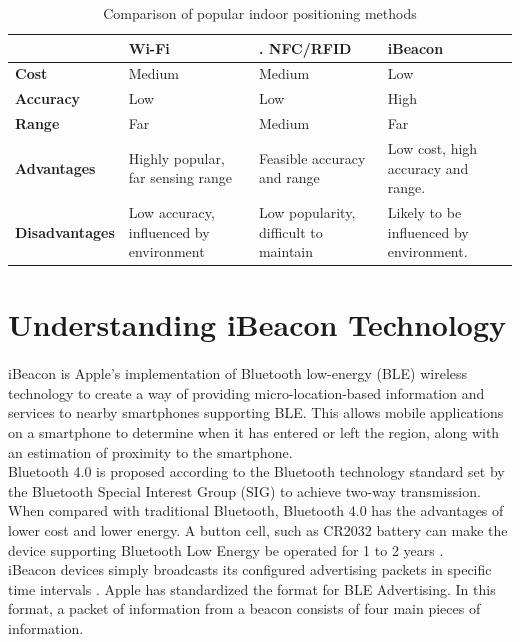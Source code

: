 \documentclass[12pt]{article}
\begin{document}
\begin{table}%
    \centering
   
    \label{my-label2-comp}
       \begin{tabular}{|p{30mm}|p{30mm}|p{30mm}|p{30mm}|}
 \hline
  & \textbf{Wi-Fi }&.        \textbf{NFC/RFID} &  \textbf{iBeacon} \\ [0.5ex] 
 \hline\hline
 \textbf{Cost} & Medium & Medium & Low \\ 
 \hline
 \textbf{Accuracy} & Low & Low & High \\
 \hline
 \textbf{Range} & Far & Medium & Far \\
 \hline
 \textbf{Advantages} & Highly popular, far sensing range & Feasible accuracy and range & Low cost, high accuracy and range. \\
 \hline
 \textbf{Disadvantages} & Low accuracy, influenced by environment & Low popularity, difficult to maintain & Likely to be influenced by environment. \\ [1ex] 
 \hline
    \end{tabular}
     \caption{Comparison of popular indoor positioning methods}
\end{table}

\section{Understanding iBeacon Technology}
\label{iBeacon-tech}
\paragraph{}iBeacon is Apple’s implementation of Bluetooth low-energy (BLE) wireless technology to create a way of providing micro-location-based information and services to nearby smartphones supporting BLE. This allows mobile applications on a smartphone to determine when it has entered or left the region, along with an estimation of proximity to the smartphone. \\

Bluetooth 4.0 is proposed according to the Bluetooth technology standard set by the Bluetooth Special Interest Group (SIG) to achieve two-way transmission. When compared with traditional Bluetooth, Bluetooth 4.0 has the advantages of lower cost and lower energy. A button cell, such as CR2032 battery can make the device supporting Bluetooth Low Energy be operated for 1 to 2 years \cite{taiwan}. \\

iBeacon devices simply broadcasts its configured advertising packets in specific time intervals \cite{one}. Apple has standardized the format for BLE Advertising. In this format, a packet of information from a beacon consists of four main pieces of information. \\
\end{document}
